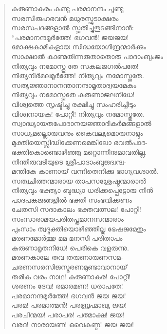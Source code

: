 \begin{verse}
കരുണാകരം കണ്ടു പരമാനന്ദം പൂണ്ടു\\
സരസീരുഹഭവന്‍ മധുരസ്ഫുടാക്ഷരം\\
സരസപദങ്ങളാല്‍ സ്തുതിച്ചുതുടങ്ങിനാന്‍:\\
“പരമാനന്ദമൂര്‍ത്തേ! ഭഗവന്‍! ജയജയ!\\
മോക്ഷകാമികളായ സിദ്ധയോഗീന്ദ്രന്മാര്‍ക്കും\\
സാക്ഷാല്‍ കാണ്മതിന്നരുതാതൊരു പാദാംബുംജം\\
നിത്യവും നമോസ്തു തേ സകലജഗല്‍പതേ!\\
നിത്യനിര്‍മലമൂര്‍ത്തേ! നിത്യവും നമോസ്തുതേ.\\
സത്യജ്ഞാനാനന്താനന്ദാമൃതാദ്വയമേകം\\
നിത്യവും നമോസ്തുതേ കരുണാജലനിധേ!\\
വിശ്വത്തെ സൃഷ്ടിച്ചു രക്ഷിച്ചു സംഹരിച്ചീടും\\
വിശ്വനായക! പോറ്റീ! നിത്യവും നമോസ്തുതേ.\\
സ്വാദ്ധ്യായതപോദാനയജ്ഞാദികര്‍മങ്ങളാല്‍\\
സാധ്യമല്ലൊരുവനും കൈവല്യമൊരുനാളും\\
മുക്തിയെസ്സിദ്ധിക്കേണമെങ്കിലോ ഭവല്‍പാദ-\\
ഭക്തികൊണ്ടൊഴിഞ്ഞു മറ്റൊന്നിനുമാവതില്ല.\\
നിന്തിരുവടിയുടെ ശ്രീപാദാംബുജദ്വന്ദ്വ-\\
മന്തികേ കാണായ് വന്നിതെനിക്കു ഭാഗ്യവശാല്‍.\\
സത്വചിത്തന്മാരായ താപസശ്രേഷ്ഠന്മാരാല്‍\\
നിത്യവും ഭക്ത്യാ ബുദ്ധ്യാ ധരിക്കപ്പെട്ടോരു നിന്‍\\
പാദപങ്കജങ്ങളില്‍ ഭക്തി സംഭവിക്കണം\\
ചേതസി സദാകാലം ഭക്തവത്സല! പോറ്റീ!\\
സംസാരാമയപരിതപ്തമാനസന്മാരാം\\
പുംസാം ത്വദ്ഭക്തിയൊഴിഞ്ഞില്ല ഭേഷജമേതും\\
മരണമോര്‍ത്തു മമ മനസി പരിതാപം\\
കരുണാമൃതനിധേ! പെരികെ വളരുന്നു.\\
മരണകാലേ തവ തരുണാരുണസമ-\\
ചരണസരസിജസ്മരണമുണ്ടാവാനായ്\\
തരിക വരം നാഥ! കരുണാകര! പോറ്റീ!\\
ശരണം ദേവ! രമാരമണ! ധരാപതേ!\\
പരമാനന്ദമൂര്‍ത്തേ! ഭഗവന്‍ ജയ ജയ!\\
പരമ! പരമാത്മന്‍! പരബ്രഹ്മാഖ്യ ജയ!\\
പരചിന്മയ! പരാപര! പത്മാക്ഷ! ജയ!\\
വരദ! നാരായണ! വൈകുണ്ഠ! ജയ ജയ!\\

\end{verse}
